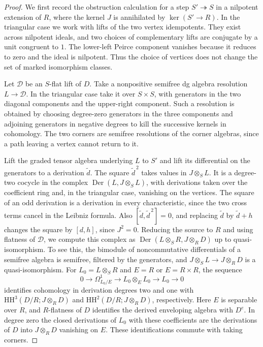 \documentclass[12pt,a4paper,english,reqno]{amsart}
\numberwithin{equation}{section}
\theoremstyle{plain}
\theoremstyle{definition}
\begin{document}
\begin{proof}
We first record the obstruction calculation for a step
$S'\twoheadrightarrow S$ in a nilpotent extension of $R$,
where the kernel $J$ is annihilated by $\ker(S'\to R)$.
In the triangular case we work with lifts of the two vertex
idempotents. They exist across nilpotent ideals, and two
choices of complementary lifts are conjugate by a unit
congruent to $1$. The lower-left Peirce component vanishes
because it reduces to zero and the ideal is nilpotent.
Thus the choice of vertices does not change the set of
marked isomorphism classes.

Let $\mathcal D$ be an $S$-flat lift of $D$. Take a nonpositive
semifree dg algebra resolution $L\to\mathcal D$. In the
triangular case take it over $S\times S$, with generators in
the two diagonal components and the upper-right component.
Such a resolution is obtained by choosing degree-zero generators
in the three components and adjoining generators in negative
degrees to kill the successive kernels in cohomology. The two
corners are semifree resolutions of the corner algebras, since
a path leaving a vertex cannot return to it.

Lift the graded tensor algebra underlying $L$ to $S'$ and lift
its differential on the generators to a derivation $\widetilde d$.
The square $\widetilde d^{\,2}$ takes values in $J\otimes_S L$.
It is a degree-two cocycle in the complex
$\operatorname{Der}(L,J\otimes_S L)$, with derivations taken
over the coefficient ring and, in the triangular case, vanishing
on the vertices. The square of an odd derivation is a derivation
in every characteristic, since the two cross terms cancel in the
Leibniz formula. Also $[\widetilde d,\widetilde d^{\,2}]=0$,
and replacing $\widetilde d$ by $\widetilde d+h$ changes the
square by $[d,h]$, since $J^2=0$. Reducing the source to $R$ and
using flatness of $\mathcal D$, we compute this complex as
$\operatorname{Der}(L\otimes_S R,J\otimes_R D)$ up to
quasi-isomorphism. To see this, the bimodule of noncommutative
differentials of a semifree algebra is semifree, filtered by
the generators, and $J\otimes_S L\to J\otimes_R D$ is a
quasi-isomorphism. For $L_0=L\otimes_S R$ and $E=R$ or
$E=R\times R$, the sequence
\[
 0\longrightarrow\Omega^1_{L_0/E}
 \longrightarrow L_0\otimes_E L_0
 \longrightarrow L_0\longrightarrow0
\]
identifies cohomology in derivation degrees two and one with
$\mathrm{HH}^{3}(D/R;J\otimes_R D)$ and
$\mathrm{HH}^{2}(D/R;J\otimes_R D)$, respectively. Here $E$
is separable over $R$, and $R$-flatness of $D$ identifies the
derived enveloping algebra with $D^e$. In degree zero the closed
derivations of $L_0$ with these coefficients are the derivations
of $D$ into $J\otimes_R D$ vanishing on $E$. These
identifications commute with taking corners.


\end{proof}
\end{document}
